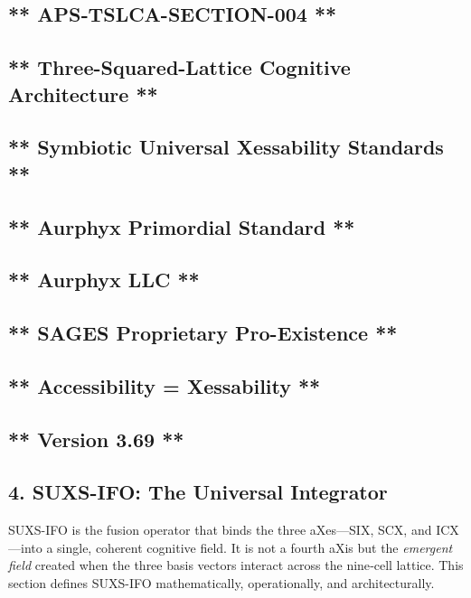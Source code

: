 \subsection{** APS‑TSLCA-SECTION-004 **}\label{apstslca-section-004}

\subsection{** Three-Squared-Lattice Cognitive Architecture **}\label{three-squared-lattice-cognitive-architecture}

\subsection{** Symbiotic Universal Xessability Standards **}\label{symbiotic-universal-xessability-standards}

\subsection{** Aurphyx Primordial Standard **}\label{aurphyx-primordial-standard}

\subsection{** Aurphyx LLC **}\label{aurphyx-llc}

\subsection{** SAGES \textbar{} Proprietary \textbar{} Pro-Existence **}\label{sages-proprietary-pro-existence}

\subsection{** Accessibility = Xessability **}\label{accessibility-xessability}

\subsection{** Version 3.69 **}\label{version-3.69}

\subsection{4. SUXS-IFO: The Universal Integrator}\label{suxs-ifo-the-universal-integrator}

SUXS-IFO is the fusion operator that binds the three aXes---SIX, SCX, and ICX---into a single, coherent cognitive field. It is not a fourth aXis but the \emph{emergent field} created when the three basis vectors interact across the nine‑cell lattice. This section defines SUXS-IFO mathematically, operationally, and architecturally.

